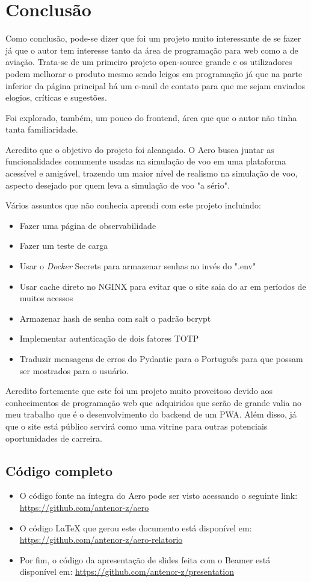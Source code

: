 \chapter{Conclusão}

Como conclusão, pode-se dizer que foi um projeto muito interessante de se fazer já que 
o autor tem interesse tanto da área de programação para web como a de aviação. Trata-se
de um primeiro 
projeto open-source grande e os utilizadores podem melhorar o produto mesmo sendo
leigos em programação já que na parte inferior da página principal há um e-mail 
de contato para que me sejam enviados elogios, críticas e sugestões.

Foi explorado, também, um pouco do frontend, área que que o autor não tinha tanta 
familiaridade.

Acredito que o objetivo do projeto foi alcançado. O Aero busca juntar as funcionalidades 
comumente usadas na simulação de voo em uma plataforma acessível e amigável, 
trazendo um maior nível de realismo na simulação de voo, aspecto desejado por quem leva
a simulação de voo "a sério".

Vários assuntos que não conhecia aprendi com este projeto incluindo:

\begin{itemize}
\item Fazer uma página de observabilidade
\item Fazer um teste de carga
\item Usar o \textit{Docker} Secrets para armazenar senhas ao invés do ".env"
\item Usar cache direto no NGINX para evitar que o site saia do ar em períodos 
de muitos acessos
\item Armazenar hash de senha com salt o padrão bcrypt
\item Implementar autenticação de dois fatores TOTP
\item Traduzir mensagens de erros do Pydantic para o Português para que possam 
ser mostrados para o usuário.
\end{itemize}

Acredito fortemente que este foi um projeto muito proveitoso devido aos 
conhecimentos de programação web que adquiridos que serão de grande valia no meu 
trabalho que é o desenvolvimento do backend de um PWA. Além disso, já que o site está público 
servirá como uma vitrine para outras potenciais oportunidades de carreira.

\section {Código completo}

\begin{itemize}
\item O código fonte na íntegra do Aero pode ser visto acessando o seguinte link: \url{https://github.com/antenor-z/aero}
\item O código LaTeX que gerou este documento está disponível em: \url{https://github.com/antenor-z/aero-relatorio}
\item Por fim, o código da apresentação de slides feita com o Beamer está disponível em: \url{https://github.com/antenor-z/presentation}
\end{itemize}
